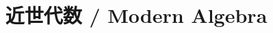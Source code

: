 \documentclass[a4paper]{report}
\title{近世代数 / Modern Algebra}
\begin{document}
    \maketitle
    \tableofcontents
    \chapter{}
    
    \chapter{}
    
    \chapter{}
    
    \chapter{}
    
    \chapter{}
    
    \chapter{}
    
    \chapter{}
    
    \chapter{}
    
    \chapter{}
    
    \chapter{}
    
    \chapter{}
    
    \chapter{}
    
    \chapter{}
    
    \chapter{}
    
\end{document}
